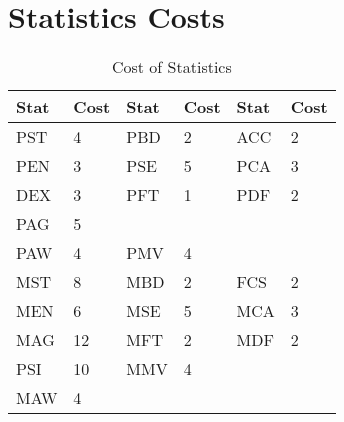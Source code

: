 \section{Statistics Costs}

\begin{table}\label{Table:StatCosts}
	\begin{tabular}{llllll}
    Stat & Cost	&	Stat& Cost	& Stat	& Cost \\
\hline
	PST  & 4	&	PBD	&	2	&	ACC	&	2	\\
	PEN  & 3 	&	PSE	&	5	&	PCA	&	3	\\
	DEX  & 3	&	PFT	&	1	&	PDF	&	2	\\
	PAG  & 5	&		&		&		&		\\ 
	PAW	 & 4	&	PMV	&	4	&		&		\\
\hline	
	MST  & 8	&	MBD	&	2	&	FCS	&	2	\\
	MEN  & 6	&	MSE	&	5	&	MCA	&	3	\\
	MAG  & 12	&	MFT	&	2	&	MDF	&	2	\\
	PSI  & 10	&	MMV	&	4	&		&		\\ 
	MAW	 & 4	&		&		&		&		\\ 
	\end{tabular}
    \caption{Cost of Statistics}
\end{table}


